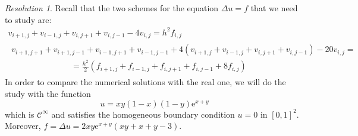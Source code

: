 \documentclass[10pt,a4paper]{article}
\theoremstyle{definition}
\theoremstyle{remark}
\newtheorem*{res}{Resolution}
\renewcommand{\exp}[1]{\mathrm{e}^{#1}} %
\begin{document}
\begin{res}
  Recall that the two schemes for the equation $\Delta u =f$ that we need to study are:
  \begin{gather*}
    v_{i+1,j}+v_{i-1,j}+v_{i,j+1}+v_{i,j-1}-4v_{i,j} = h^2f_{i,j}                                                                                                                             \\
    \begin{split}
      v_{i+1,j+1} + v_{i+1,j-1} + v_{i-1,j+1} + v_{i-1,j-1} +4 (v_{i+1,j} + v_{i-1,j} + v_{i,j+1} + v_{i,j-1}) - 20 v_{i,j} =\hspace{3cm} \\
      \hspace{3cm}=\frac{h^2}{2}\left( f_{i+1,j} + f_{i-1,j} + f_{i,j+1} + f_{i,j-1} + 8f_{i,j} \right)
    \end{split}
  \end{gather*}
  In order to compare the numerical solutions with the real one, we will do the study with the function $$u=xy(1-x)(1-y)\exp{x+y}$$ which is $\mathcal{C}^\infty$ and satisfies the homogeneous boundary condition $u=0$ in $[0,1]^2$. Moreover, $f=\Delta u = 2xy\exp{x+y}(xy+x+y-3)$.


\end{res}
\end{document}

